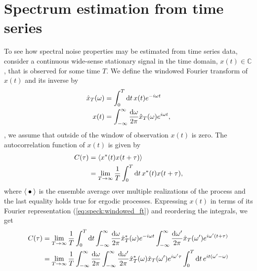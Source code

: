 \section{Spectrum estimation from time series}\label{sec:speck:theory:time_series_estimation}
To see how spectral noise properties may be estimated from time series data, consider a continuous wide-sense stationary
signal in the time domain, $x(t)\in\mathbb{C}$, that is observed for some time $T$.
We define the windowed Fourier transform of $x(t)$ and its inverse by
\begin{align}
    \hat{x}_T(\omega) &= \int_{0}^{T}\dd{t} x(t)e^{-i\omega t} \label{eq:speck:windowed_ft}\\
                 x(t) &= \int_{-\infty}^{\infty}\frac{\dd{\omega}}{2\pi}\hat{x}_T(\omega)e^{i\omega t}, \label{eq:speck:windowed_ft:inverse}
\end{align}
\ie, we assume that outside of the window of observation $x(t)$ is zero.
The autocorrelation function of $x(t)$ is given by
\begin{align}
    C(\tau) &= \expval{x\conjugate(t) x(t + \tau)} \label{eq:speck:autocorrelation}\\
            &= \lim_{T\to\infty} \frac{1}{T}\int_0^T\dd{t} x\conjugate(t) x(t + \tau),
\end{align}
where $\expval{\:\bullet\:}$ is the ensemble average over multiple realizations of the process and the last equality holds true for ergodic processes.
Expressing $x(t)$ in terms of its Fourier representation (\cref{eq:speck:windowed_ft}) and reordering the integrals, we get
\begin{align}
    C(\tau) &= \lim_{T\to\infty}\frac{1}{T}\int_0^T\dd{t}
                \int_{-\infty}^{\infty}\frac{\dd{\omega}}{2\pi}\hat{x}_T^\ast(\omega)e^{-i\omega t}
                \int_{-\infty}^{\infty}\frac{\dd{\omega^\prime}}{2\pi}\hat{x}_T(\omega^\prime)e^{i\omega^\prime (t + \tau)}  \\
            &= \lim_{T\to\infty}\frac{1}{T}\int_{-\infty}^{\infty}\frac{\dd{\omega}}{2\pi}\int_{-\infty}^{\infty}\frac{\dd{\omega^\prime}}{2\pi}
                \hat{x}_T^\ast(\omega)\hat{x}_T(\omega^\prime)e^{i\omega^\prime\tau}
                \int_0^T\dd{t}e^{i t (\omega^\prime - \omega)} \label{eq:speck:autocorrelation:fourier}
\end{align}
